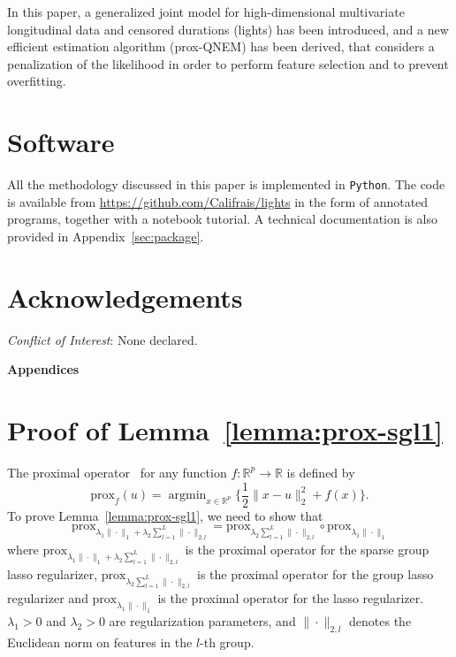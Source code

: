 \documentclass[11pt]{article}
\DeclareMathOperator{\argmin}{argmin}
\newcommand{\norm}[1]{\|#1\|}
\newcommand{\R}{\mathds R}
\begin{document}
In this paper, a generalized joint model for high-dimensional multivariate longitudinal data and censored durations (lights) has been introduced, and a new efficient estimation
algorithm (prox-QNEM) has been derived, that considers a penalization of the likelihood in order to perform feature
selection and to prevent overfitting.


\section*{Software}
All the methodology discussed in this paper is implemented in \texttt{Python}. The code is available from \url{https://github.com/Califrais/lights} in the form of annotated programs, together with a notebook tutorial. A technical documentation is also provided in Appendix~\ref{sec:package}.

\section*{Acknowledgements}
\textit{Conflict of Interest}: None declared.

\appendix

\begin{center}
\LARGE \textbf{Appendices}
\end{center}

\section{Proof of Lemma~\ref{lemma:prox-sgl1}}
\label{sec:proof-lemma-prox-sgl1}

The proximal operator~\citep{moreau1962fonctions} for any function $f : \R^p \to \R$ is defined by
\begin{equation}
    \label{eq:prox-def}
    \text{prox}_{f}(u) = \argmin_{x \in \R^p} \big\{\frac{1}{2}\norm{x - u}_2^2 + f(x)\big\}.
\end{equation}
To prove Lemma~\ref{lemma:prox-sgl1}, we need to show that
\[\text{prox}_{\lambda_1 \norm{\cdot}_1 + \lambda_2 \sum_{l=1}^L  \norm{\cdot}_{2,l}} = \text{prox}_{\lambda_2 \sum_{l=1}^L \norm{\cdot}_{2,l}} \circ \text{prox}_{\lambda_1 \norm{\cdot}_1}\]
where $\text{prox}_{\lambda_1 \norm{\cdot}_1 + \lambda_2 \sum_{l=1}^L \norm{\cdot}_{2,l}}$ is the proximal operator for the sparse group lasso regularizer, $\text{prox}_{\lambda_2 \sum_{l=1}^L \norm{\cdot}_{2,l}}$ is the proximal operator for the group lasso regularizer and $\text{prox}_{\lambda_1 \norm{\cdot}_1}$ is the proximal operator for the lasso regularizer. $\lambda_1 > 0$ and $\lambda_2 > 0$ are regularization parameters, and $\norm{\cdot}_{2,l}$ denotes the Euclidean norm on features in the $l$-th group.
\end{document}
